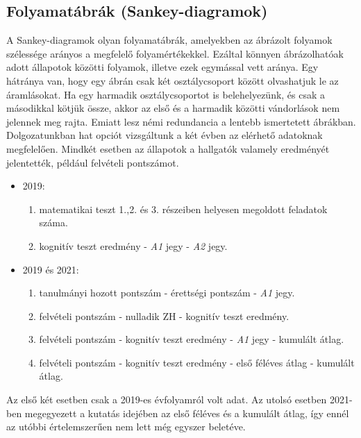 \documentclass[12pt]{article}
\begin{document}
\subsection{Folyamatábrák (Sankey-diagramok)}
A Sankey-diagramok olyan folyamatábrák, amelyekben az ábrázolt folyamok szélessége arányos a megfelelő folyamértékekkel. Ezáltal könnyen ábrázolhatóak adott állapotok közötti folyamok, illetve ezek egymással vett aránya. Egy hátránya van, hogy egy ábrán csak két osztálycsoport között olvashatjuk le az áramlásokat. Ha egy harmadik osztálycsoportot is belehelyezünk, és csak a másodikkal kötjük össze, akkor az első és a harmadik közötti vándorlások nem jelennek meg rajta. Emiatt lesz némi redundancia a lentebb ismertetett ábrákban.\\
Dolgozatunkban hat opciót vizsgáltunk a két évben az elérhető adatoknak megfelelően. Mindkét esetben az állapotok a hallgatók valamely eredményét jelentették, például felvételi pontszámot.
\begin{itemize}

\item 2019:

\begin{enumerate}
\item matematikai teszt 1.,2. és 3. részeiben helyesen megoldott feladatok száma.
\item kognitív teszt eredmény - \textit{A1} jegy - \textit{A2} jegy.
\end{enumerate}

\item 2019 és 2021:

\begin{enumerate}
\item tanulmányi hozott pontszám - érettségi pontszám - \textit{A1} jegy.
\item felvételi pontszám - nulladik ZH - kognitív teszt eredmény.
\item felvételi pontszám - kognitív teszt eredmény - \textit{A1} jegy - kumulált átlag.
\item felvételi pontszám - kognitív teszt eredmény - első féléves átlag - kumulált átlag.
\end{enumerate}

\end{itemize}

Az első két esetben csak a 2019-es évfolyamról volt adat. Az utolsó esetben 2021-ben megegyezett a kutatás idejében az első féléves és a kumulált átlag, így ennél az utóbbi értelemszerűen nem lett még egyszer beletéve.
\end{document}
